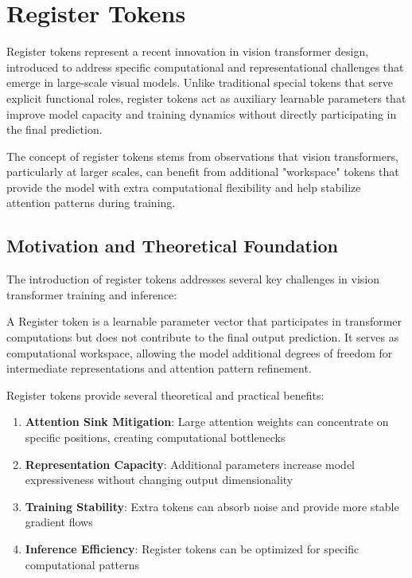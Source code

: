
\section{Register Tokens}

Register tokens represent a recent innovation in vision transformer design, introduced to address specific computational and representational challenges that emerge in large-scale visual models. Unlike traditional special tokens that serve explicit functional roles, register tokens act as auxiliary learnable parameters that improve model capacity and training dynamics without directly participating in the final prediction.

The concept of register tokens stems from observations that vision transformers, particularly at larger scales, can benefit from additional "workspace" tokens that provide the model with extra computational flexibility and help stabilize attention patterns during training.

\subsection{Motivation and Theoretical Foundation}

The introduction of register tokens addresses several key challenges in vision transformer training and inference:

\begin{definition}
A Register token is a learnable parameter vector that participates in transformer computations but does not contribute to the final output prediction. It serves as computational workspace, allowing the model additional degrees of freedom for intermediate representations and attention pattern refinement.
\end{definition}

Register tokens provide several theoretical and practical benefits:

\begin{enumerate}
\item \textbf{Attention Sink Mitigation}: Large attention weights can concentrate on specific positions, creating computational bottlenecks
\item \textbf{Representation Capacity}: Additional parameters increase model expressiveness without changing output dimensionality
\item \textbf{Training Stability}: Extra tokens can absorb noise and provide more stable gradient flows
\item \textbf{Inference Efficiency}: Register tokens can be optimized for specific computational patterns
\end{enumerate}

